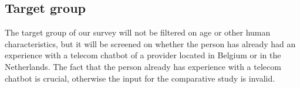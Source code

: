 \subsection{Target group}
The target group of our survey will not be filtered on age or other human characteristics, but it will be screened on whether the person has already had an experience with a telecom chatbot of a provider located in Belgium or in the Netherlands. The fact that the person already has experience with a telecom chatbot is crucial, otherwise the input for the comparative study is invalid.
